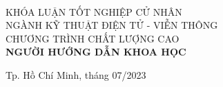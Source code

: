 \begin{titlepage}
\begin{center}
{ \Large \bfseries \tenKL \\[2cm] } 


\large KHÓA LUẬN TỐT NGHIỆP CỬ NHÂN\\
\large NGÀNH KỸ THUẬT ĐIỆN TỬ - VIỄN THÔNG\\
\large CHƯƠNG TRÌNH CHẤT LƯỢNG CAO\\[2cm]

\textbf{NGƯỜI HƯỚNG DẪN KHOA HỌC}\\
\tenGVHD


\vfill
Tp. Hồ Chí Minh, tháng 07/2023

\end{center}
\thispagestyle{empty}
\end{titlepage}
\hypersetup{pageanchor=true}